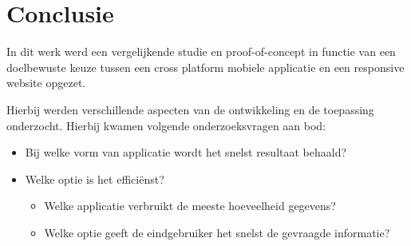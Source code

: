 
\chapter{Conclusie}
\label{ch:conclusie}








In dit werk werd een vergelijkende studie en proof-of-concept in functie van een doelbewuste keuze tussen een
cross platform mobiele applicatie en een responsive website opgezet.

Hierbij werden verschillende aspecten van de ontwikkeling
en de toepassing onderzocht. Hierbij kwamen volgende onderzoeksvragen aan bod:

\begin{itemize}
  \item{Bij welke vorm van applicatie wordt het snelst resultaat behaald?}
  \item{Welke optie is het efficiënst?}
  \begin{itemize}
    \item{Welke applicatie verbruikt de meeste hoeveelheid gegevens?}
    \item{Welke optie geeft de eindgebruiker het snelst de gevraagde informatie?}
  \end{itemize}
\end{itemize}

